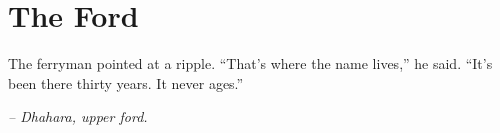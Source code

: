 \chapter*{The Ford}

The ferryman pointed at a ripple. ``That's where the name lives,'' he said. ``It's been there thirty years. It never ages.''

\smallskip

\noindent \textit{-- Dhahara, upper ford.}

